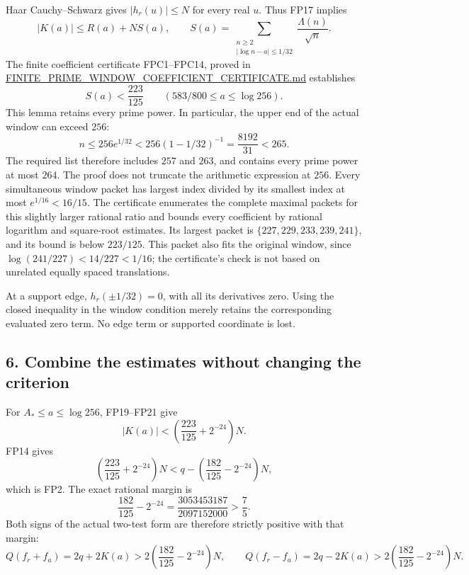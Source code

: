 \documentclass[
  10pt,
  a4paper,
]{article}
\begin{document}
Haar Cauchy--Schwarz gives \(|h_r(u)|\le N\) for every real \(u\). Thus
FP17 implies \[
 |K(a)|\le R(a)+N S(a),\qquad
 S(a)=\sum_{\substack{n\ge2\\|\log n-a|\le1/32}}
                  \frac{\Lambda(n)}{\sqrt n}.
 \tag{FP20}
\] The finite coefficient certificate FPC1--FPC14, proved in
\url{FINITE_PRIME_WINDOW_COEFFICIENT_CERTIFICATE.md} establishes \[
 \boxed{\displaystyle S(a)<\frac{223}{125}
            \qquad(583/800\le a\le\log256).}
 \tag{FP21}
\] This lemma retains every prime power. In particular, the upper end of
the actual window can exceed \(256\): \[
 n\le256e^{1/32}
 <256(1-1/32)^{-1}=\frac{8192}{31}<265.
 \tag{FP22}
\] The required list therefore includes \(257\) and \(263\), and
contains every prime power at most \(264\). The proof does not truncate
the arithmetic expression at \(256\). Every simultaneous window packet
has largest index divided by its smallest index at most
\(e^{1/16}<16/15\). The certificate enumerates the complete maximal
packets for this slightly larger rational ratio and bounds every
coefficient by rational logarithm and square-root estimates. Its largest
packet is \(\{227,229,233,239,241\}\), and its bound is below
\(223/125\). This packet also fits the original window, since
\(\log(241/227)<14/227<1/16\); the certificate's check is not based on
unrelated equally spaced translations.

At a support edge, \(h_r(\pm1/32)=0\), with all its derivatives zero.
Using the closed inequality in the window condition merely retains the
corresponding evaluated zero term. No edge term or supported coordinate
is lost.

\subsection{6. Combine the estimates without changing the
criterion}\label{combine-the-estimates-without-changing-the-criterion}

For \(A_*\le a\le\log256\), FP19--FP21 give \[
 |K(a)|<
 \left(\frac{223}{125}+2^{-24}\right)N.
\] FP14 gives \[
 \left(\frac{223}{125}+2^{-24}\right)N
 <q-\left(\frac{182}{125}-2^{-24}\right)N,
\] which is FP2. The exact rational margin is \[
 \frac{182}{125}-2^{-24}
       =\frac{3053453187}{2097152000}>\frac75.
 \tag{FP23}
\] Both signs of the actual two-test form are therefore strictly
positive with that margin: \[
 Q(f_r+f_a)=2q+2K(a)>
       2\left(\frac{182}{125}-2^{-24}\right)N,\qquad
 Q(f_r-f_a)=2q-2K(a)>
       2\left(\frac{182}{125}-2^{-24}\right)N.
 \tag{FP24}
\]
\end{document}
